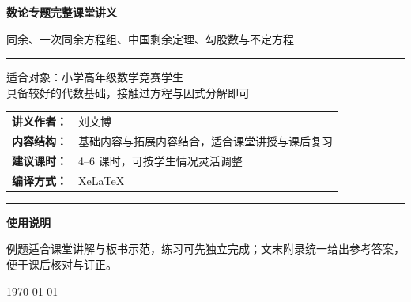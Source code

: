 \documentclass[11pt,a4paper,fontset=fandol]{ctexart}
\theoremstyle{formaltheorem}
\theoremstyle{formalexample}
\begin{document}
\thispagestyle{empty}
\begin{titlepage}
\centering
\vspace*{1.2cm}

\begin{tcolorbox}[
  enhanced,
  width=0.92\textwidth,
  colback=white,
  colframe=mainblue,
  boxrule=1pt,
  arc=0mm,
  left=6mm,
  right=6mm,
  top=8mm,
  bottom=8mm
]
\centering

{\fontsize{24}{30}\selectfont\bfseries 数论专题完整课堂讲义\par}
\vspace{0.7cm}
{\fontsize{17}{22}\selectfont 同余、一次同余方程组、中国剩余定理、勾股数与不定方程\par}

\vspace{1.2cm}
\color{rulegray}\rule{0.72\textwidth}{0.7pt}\par
\vspace{1.1cm}

\begin{tcolorbox}[colback=lightblue,colframe=mainblue,width=0.82\textwidth,boxrule=1pt]
\centering
{\Large 适合对象：小学高年级数学竞赛学生}\\[0.4em]
{\large 具备较好的代数基础，接触过方程与因式分解即可}
\end{tcolorbox}

\vspace{1.5cm}

\renewcommand{\arraystretch}{1.4}
\begin{tabular}{>{\bfseries}p{3.5cm}p{8cm}}
讲义作者： & 刘文博 \\
内容结构： & 基础内容与拓展内容结合，适合课堂讲授与课后复习 \\
建议课时： & 4--6 课时，可按学生情况灵活调整 \\
编译方式： & XeLaTeX \\
\end{tabular}

\vspace{1.4cm}
\color{rulegray}\rule{0.72\textwidth}{0.7pt}\par
\vspace{0.9cm}

{\large \bfseries 使用说明\par}
\vspace{0.4cm}
{\normalsize 例题适合课堂讲解与板书示范，练习可先独立完成；文末附录统一给出参考答案，便于课后核对与订正。\par}

{\large \today\par}
\end{tcolorbox}
\end{titlepage}
\end{document}
